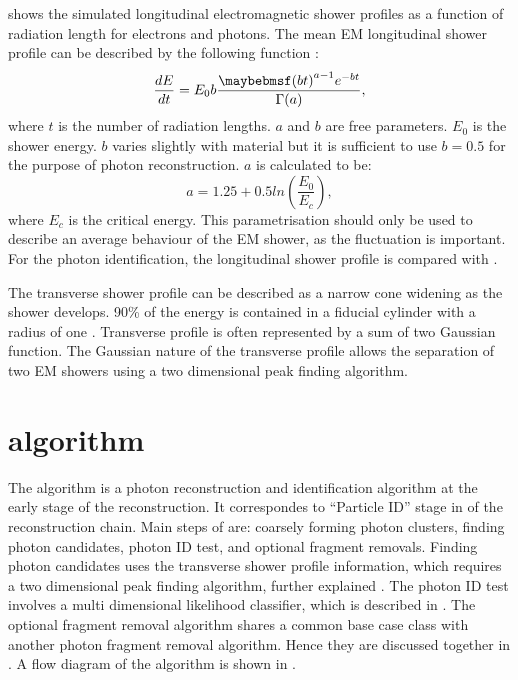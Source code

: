 shows the simulated longitudinal electromagnetic shower profiles as a function of radiation length for electrons and photons. The mean EM longitudinal shower profile can be described by the following function \cite{Longo:1975wb} :
\begin{equation}
\frac{dE}{dt} = E_0 b \frac{\parenths{bt}^{a-1}e^{-bt}}{\Gamma(a)},
\label{eq:photonEMshower}
\end{equation}
where $t$ is the number of radiation lengths. $a$ and $b$ are free parameters. $E_0$ is the shower energy. $b$ varies slightly with material but it is sufficient to use $b = 0.5$ for the purpose of photon reconstruction. $a$ is calculated to be:
\begin{equation}
a = 1.25 + 0.5ln\left(\frac{E_0}{E_c}\right),
\end{equation}
where $E_c$ is the critical energy. This parametrisation should only be used to describe an average behaviour of the EM shower, as the fluctuation is important. For the photon identification, the longitudinal shower profile is compared with .

The transverse shower profile can be described as  a narrow cone widening as the shower develops. 90\% of the energy  is contained in a fiducial cylinder with a radius of one \RM. Transverse profile is often represented by a sum of two Gaussian function. The Gaussian nature of the transverse profile allows the separation of two EM showers using a two dimensional peak finding algorithm.

\section{\PhotonReconstruction algorithm}
\label{sec:photonRecostrcution}


The \PhotonReconstruction algorithm is a photon reconstruction and  identification algorithm at the early stage of the reconstruction. It correspondes to ``Particle ID'' stage in  of the \pandora reconstruction chain.  Main steps of \PhotonReconstruction are: coarsely forming photon clusters, finding photon candidates, photon ID test, and optional fragment removals. Finding photon candidates uses the transverse shower profile information, which requires a  two dimensional peak finding algorithm, further explained . The photon ID test involves a multi dimensional likelihood classifier, which is described in . The optional fragment removal algorithm shares a common base case class with another photon fragment removal algorithm. Hence they are discussed together in  . A flow diagram of the \PhotonReconstruction algorithm is shown in .

